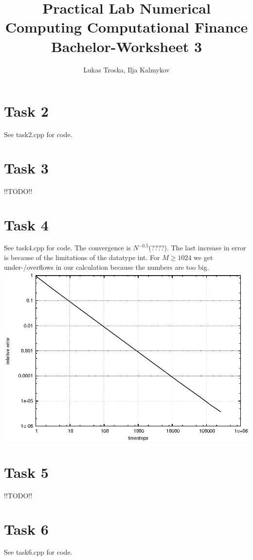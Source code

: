 \documentclass[]{article}
\title{Practical Lab Numerical Computing Computational Finance \\Bachelor-Worksheet 3}
\author{Lukas Troska, Ilja Kalmykov}
\date{}
\begin{document}
\maketitle
\section*{Task 2}
See task2.cpp for code.

\section*{Task 3}
!!TODO!!

\section*{Task 4}
See task4.cpp for code. The convergence is $N^{-0.5}$(????). The last increase in error is because of the limitations of the datatype int. For $M\ge 1024$ we get under-/overflows in our calculation because the numbers are too big.
\\
\includegraphics{task4.eps}\\

\section*{Task 5}
!!TODO!!

\section*{Task 6}
See task6.cpp for code.
\end{document}
